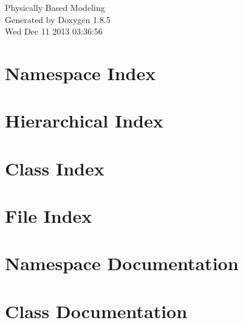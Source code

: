 \documentclass[twoside]{book}
\newcommand{\clearemptydoublepage}{%
  \newpage{\pagestyle{empty}\cleardoublepage}%
}
\begin{document}
\hypersetup{pageanchor=false}
\begin{titlepage}
\vspace*{7cm}
\begin{center}%
{\Large Physically Based Modeling }\\
\vspace*{1cm}
{\large Generated by Doxygen 1.8.5}\\
\vspace*{0.5cm}
{\small Wed Dec 11 2013 03:36:56}\\
\end{center}
\end{titlepage}
\clearemptydoublepage
\tableofcontents
\clearemptydoublepage
{}
\hypersetup{pageanchor=true}

\chapter{Namespace Index}

\chapter{Hierarchical Index}

\chapter{Class Index}

\chapter{File Index}

\chapter{Namespace Documentation}


\chapter{Class Documentation}






























\end{document}
